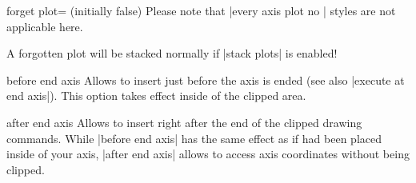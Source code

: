 \begin{pgfplotskey}{forget plot= (initially false)}
    Please note that |every axis plot no | styles are not
    applicable here.

    A forgotten plot will be stacked normally if |stack plots| is enabled!
\end{pgfplotskey}

\begin{pgfplotscodekey}{before end axis}
    Allows to insert  just before the axis is ended (see also
    |execute at end axis|). This option takes effect inside of the clipped
    area.
\begin{codeexample}[]
\end{codeexample}
\end{pgfplotscodekey}

\begin{pgfplotscodekey}{after end axis}
    Allows to insert  right after the end of the clipped drawing
    commands. While |before end axis| has the same effect as if 
    had been placed inside of your axis, |after end axis| allows to access axis
    coordinates without being clipped.
\begin{codeexample}[]
\end{codeexample}
\end{pgfplotscodekey}

